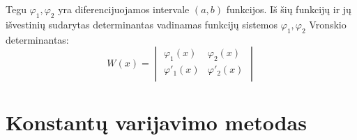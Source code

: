 \begin{defn}
  Tegu $\varphi_{1}, \varphi_{2}$ yra diferencijuojamos intervale
  $(a, b)$ funkcijos. Iš šių funkcijų ir jų išvestinių
  sudarytas determinantas vadinamas funkcijų sistemos
  $\varphi_{1}, \varphi_{2}$ Vronskio determinantas:
  \begin{equation*}
    W(x) =%
    \begin{vmatrix}
      \varphi_{1}(x) & \varphi_{2}(x) \\
      \varphi'_{1}(x) & \varphi'_{2}(x) \\
    \end{vmatrix}
  \end{equation*}
\end{defn}

\section{Konstantų varijavimo metodas}

\cite[97]{konspektas}

